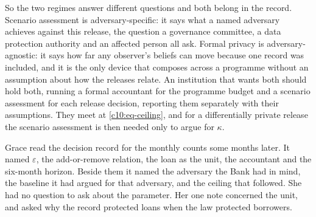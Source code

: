 So the two regimes answer different questions and both belong in the record.
Scenario assessment is adversary-specific: it says what a named adversary achieves
against this release, the question a governance committee, a data protection
authority and an affected person all ask. Formal privacy is adversary-agnostic: it
says how far any observer's beliefs can move because one record was included, and
it is the only device that composes across a programme without an assumption about
how the releases relate. An institution that wants both should hold both, running
a formal accountant for the programme budget and a scenario assessment for each
release decision, reporting them separately with their assumptions. They meet at
\eqref{c10:eq-ceiling}, and for a differentially private release the scenario
assessment is then needed only to argue for $\kappa$.

Grace read the decision record for the monthly counts some months later. It named
$\varepsilon$, the add-or-remove relation, the loan as the unit, the accountant and
the six-month horizon. Beside them it named the adversary the Bank had in mind, the
baseline it had argued for that adversary, and the ceiling that followed. She had
no question to ask about the parameter. Her one note concerned the unit, and asked
why the record protected loans when the law protected borrowers.

